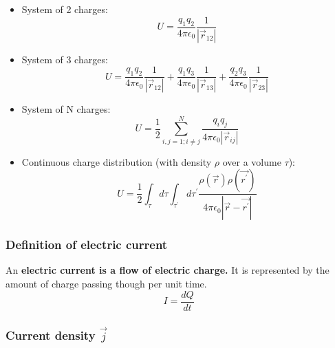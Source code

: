 \documentclass[english,11pt]{article}
\begin{document}
          \begin{itemize}
          \item System of 2 charges:
           \begin{equation*}
                U = \frac{q_1 q_2}{4\pi\epsilon_0} \frac{1}{|\vec{r}_{12}|}
           \end{equation*}

          \item System of 3 charges:
           \begin{equation*}
             U = \frac{q_1 q_2}{4\pi\epsilon_0} \frac{1}{|\vec{r}_{12}|} +
                 \frac{q_1 q_3}{4\pi\epsilon_0} \frac{1}{|\vec{r}_{13}|} +
                 \frac{q_2 q_3}{4\pi\epsilon_0} \frac{1}{|\vec{r}_{23}|}
           \end{equation*}

          \item System of N charges:
           \begin{equation*}
             U = \frac{1}{2} \sum_{i,j=1;i{\ne}j}^{N} \frac{q_i q_j}{4\pi\epsilon_0|\vec{r}_{ij}|}
           \end{equation*}

          \item Continuous charge distribution (with density $\rho$ over a volume $\tau$):
           \begin{equation*}
              U = \frac{1}{2} \int_{\tau} d\tau \int_{\tau^{\prime}} d\tau^{\prime}
                  \frac{\rho(\vec{r}) \rho(\vec{r^{\prime}})}{4\pi\epsilon_0|\vec{r} - \vec{r^{\prime}}|}
           \end{equation*}

          \end{itemize}

\subsubsection*{\bf Definition of electric current}

An {\bf electric current is a flow of electric charge.}
It is represented by the amount of charge passing though per unit time.
\begin{equation*}
  I = \frac{dQ}{dt}
\end{equation*}

\subsubsection*{\bf Current density $\vec{j}$}
\end{document}
